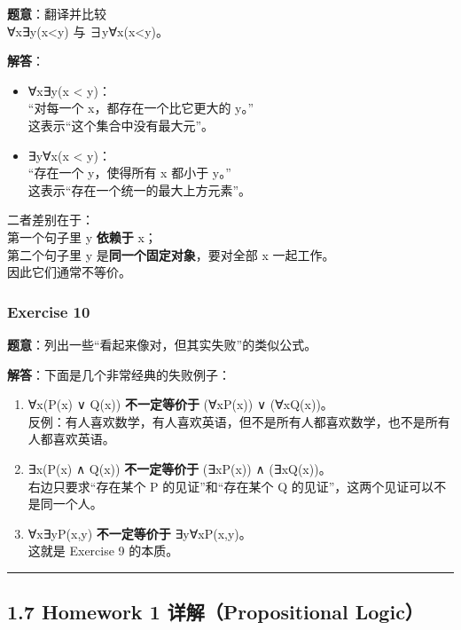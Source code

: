 \documentclass[
  11pt,
]{article}
\begin{document}
\textbf{题意}：翻译并比较\\
∀x∃y(x\textless y) 与 ∃y∀x(x\textless y)。

\textbf{解答}：

\begin{itemize}
\item
  ∀x∃y(x \textless{} y)：\\
  ``对每一个 x，都存在一个比它更大的 y。''\\
  这表示``这个集合中没有最大元''。
\item
  ∃y∀x(x \textless{} y)：\\
  ``存在一个 y，使得所有 x 都小于 y。''\\
  这表示``存在一个统一的最大上方元素''。
\end{itemize}

二者差别在于：\\
第一个句子里 y \textbf{依赖于} x；\\
第二个句子里 y 是\textbf{同一个固定对象}，要对全部 x 一起工作。\\
因此它们通常不等价。

\subsubsection{Exercise 10}\label{exercise-10}

\textbf{题意}：列出一些``看起来像对，但其实失败''的类似公式。

\textbf{解答}：下面是几个非常经典的失败例子：

\begin{enumerate}
\def\labelenumi{\arabic{enumi}.}
\item
  ∀x(P(x) ∨ Q(x)) \textbf{不一定等价于} (∀xP(x)) ∨ (∀xQ(x))。\\
  反例：有人喜欢数学，有人喜欢英语，但不是所有人都喜欢数学，也不是所有人都喜欢英语。
\item
  ∃x(P(x) ∧ Q(x)) \textbf{不一定等价于} (∃xP(x)) ∧ (∃xQ(x))。\\
  右边只要求``存在某个 P 的见证''和``存在某个 Q
  的见证''，这两个见证可以不是同一个人。
\item
  ∀x∃yP(x,y) \textbf{不一定等价于} ∃y∀xP(x,y)。\\
  这就是 Exercise 9 的本质。
\end{enumerate}

\begin{center}\rule{0.5\linewidth}{0.5pt}\end{center}

\subsection{1.7 Homework 1 详解（Propositional
Logic）}\label{homework-1-ux8be6ux89e3propositional-logic}
\end{document}
